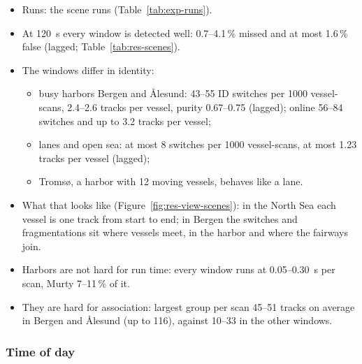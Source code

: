 \begin{itemize}
    \item Runs: the scene runs (Table~\ref{tab:exp-runs}).
    \item At 120~s every window is detected well: 0.7--4.1\,\% missed and at most 1.6\,\% false (lagged; Table~\ref{tab:res-scenes}).
    \item The windows differ in identity:
    \begin{itemize}
        \item busy harbors Bergen and Ålesund: 43--55 ID switches per 1000 vessel-scans, 2.4--2.6 tracks per vessel, purity 0.67--0.75 (lagged); online 56--84 switches and up to 3.2 tracks per vessel;
        \item lanes and open sea: at most 8 switches per 1000 vessel-scans, at most 1.23 tracks per vessel (lagged);
        \item Tromsø, a harbor with 12 moving vessels, behaves like a lane.
    \end{itemize}
    \item What that looks like (Figure~\ref{fig:res-view-scenes}): in the North Sea each vessel is one track from start to end; in Bergen the switches and fragmentations sit where vessels meet, in the harbor and where the fairways join.
    \item Harbors are not hard for run time: every window runs at 0.05--0.30~s per scan, Murty 7--11\,\% of it.
    \item They are hard for association: largest group per scan 45--51 tracks on average in Bergen and Ålesund (up to 116), against 10--33 in the other windows.
\end{itemize}

\subsubsection{Time of day}
\label{sec:res-time-of-day}

